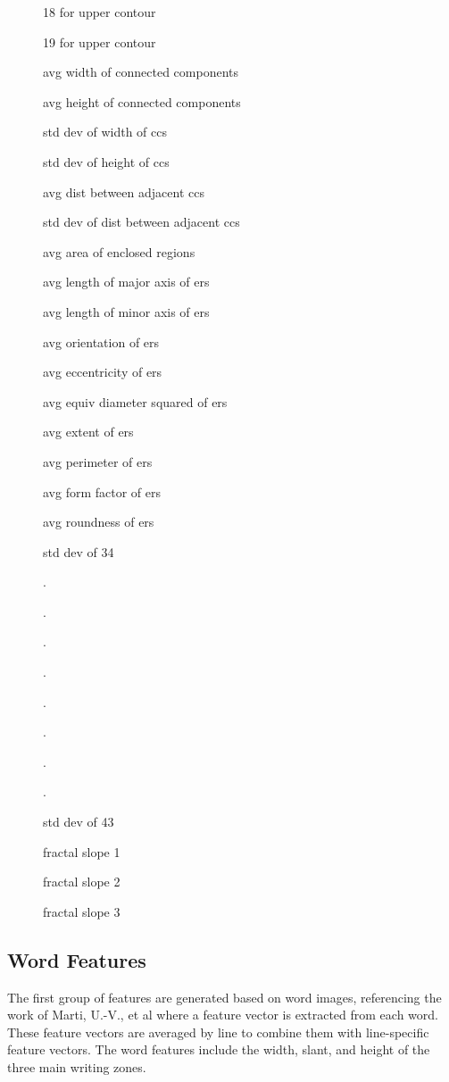 \documentclass[paper=a4, fontsize=11pt]{scrartcl} %
\numberwithin{equation}{section} %
\numberwithin{figure}{section} %
\numberwithin{table}{section} %
\begin{document}
\begin{figure}
\begin{multicols}{3}
\begin{enumerate*}
\item 18 for upper contour					
\item 19 for upper contour					
\item avg width of connected components		
\item avg height of connected components		
\item std dev of width of ccs				
\item std dev of height of ccs				
\item avg dist between adjacent ccs			
\item std dev of dist between adjacent ccs		
\item avg area of enclosed regions			
\item avg length of major axis of ers			
\item avg length of minor axis of ers			
\item avg orientation of ers					
\item avg eccentricity of ers				
\item avg equiv diameter squared of ers			
\item avg extent of ers					
\item avg perimeter of ers					
\item avg form factor of ers				
\item avg roundness of ers					
\item std dev of 34						
\item .							
\item .							
\item .							
\item .							
\item .							
\item .							
\item .							
\item .							
\item std dev of 43						
\item fractal slope 1						
\item fractal slope 2						
\item fractal slope 3	
\end{enumerate*}
\end{multicols}
\end{figure}

\subsection{Word Features}
The first group of features are generated based on word images,
referencing the work of Marti, U.-V., et al \cite{WriterID} where a
feature vector is extracted from each word. These feature vectors are
averaged by line to combine them with line-specific feature
vectors. The word features include the width, slant, and height of the
three main writing zones.
\end{document}
